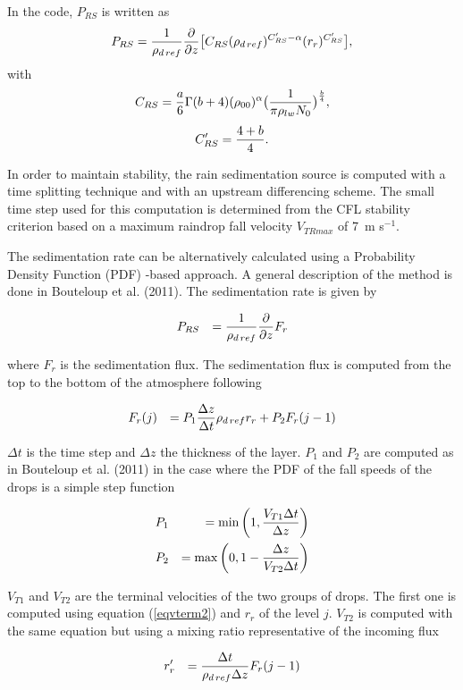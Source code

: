 In the code, $P_{RS}$ is written as
\begin{equation}
P_{RS} = {1 \over \rho_{d\,ref}}{\partial \over \partial z} \big[ C_{RS}
(\rho_{d\,ref})^{C'_{RS}-\alpha} (r_r )^{C'_{RS}}\big],
\end{equation}
with
$$C_{RS}= {a \over 6} \Gamma(b+4)( \rho_{00}) ^\alpha
\big( {1\over \pi \rho_{lw} N_0} \big)^{b \over 4},$$
$$C'_{RS}={4+b \over 4}.$$

In order to maintain stability, the rain sedimentation source is computed with
a time splitting technique and with  an upstream differencing scheme. The small
time step used for this computation is determined from the CFL stability
criterion based on a maximum raindrop fall velocity $V_{TRmax}$ of 7~m s$^{-1}$.

The sedimentation rate can be alternatively calculated using a Probability Density Function (PDF)
-based approach. A general
description of the method is done in Bouteloup et al. (2011). The sedimentation rate is given by

\begin{eqnarray}
&P_{RS} &= {1 \over \rho_{d\,ref}} {\partial \over \partial z} F_r
\end{eqnarray}

where $F_r$ is the sedimentation flux. The sedimentation flux is computed from the top to the 
bottom of the atmosphere following

\begin{eqnarray}
&F_r(j) &= P_1 {\Delta z \over \Delta t} \rho_{d\,ref} r_r + P_2 F_r(j-1)
\end{eqnarray}

$\Delta t$ is the time step and $\Delta z$ the thickness of the layer. 
$P_1$ and $P_2$ are computed as in Bouteloup et al. (2011) in the case where the PDF
of the fall speeds of the drops is a simple step function


\begin{eqnarray}
&P_1 &= \min\left(1,{V_{T1} \Delta t \over \Delta z} \right)  \\
&P_2 &= \max\left(0, 1 - {\Delta z \over V_{T2} \Delta t} \right)
\end{eqnarray}

$V_{T1}$ and $V_{T2}$ are the terminal velocities of the two groups of drops. The first one is computed
using equation (\ref{eqvterm2}) and $r_r$ of the level $j$. $V_{T2}$ is computed with the same equation but
using a mixing ratio representative of the incoming flux

\begin{eqnarray}
&r'_r &= {\Delta t \over \rho_{d\,ref} \Delta z} F_r(j-1) 
\end{eqnarray}

